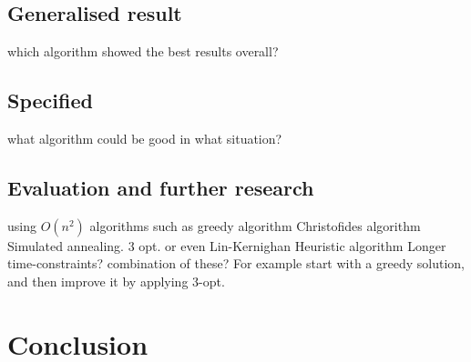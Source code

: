 \documentclass{article}
\begin{document}
\subsection{Generalised result}\label{subsec1}
which algorithm showed the best results overall?


\subsection{Specified }\label{subsec2}
what algorithm could be good in what situation?


\subsection{Evaluation and further research}\label{subsec3}
using $O(n^2)$ algorithms such as 
greedy algorithm
Christofides algorithm
Simulated annealing.
3 opt. or even Lin-Kernighan Heuristic algorithm
Longer time-constraints?
combination of these? For example start with a greedy solution, and then improve it by applying 3-opt.

\section{Conclusion}\label{sec5}






\newpage

 \label{sec6}
\end{document}
